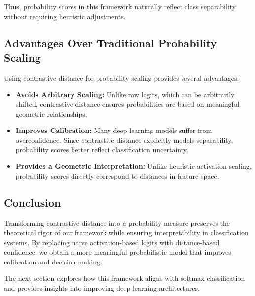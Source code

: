 Thus, probability scores in this framework naturally reflect class separability without requiring heuristic adjustments.

\subsection{Advantages Over Traditional Probability Scaling}

Using contrastive distance for probability scaling provides several advantages:

\begin{itemize}
    \item \textbf{Avoids Arbitrary Scaling:} Unlike raw logits, which can be arbitrarily shifted, contrastive distance ensures probabilities are based on meaningful geometric relationships.
    \item \textbf{Improves Calibration:} Many deep learning models suffer from overconfidence. Since contrastive distance explicitly models separability, probability scores better reflect classification uncertainty.
    \item \textbf{Provides a Geometric Interpretation:} Unlike heuristic activation scaling, probability scores directly correspond to distances in feature space.
\end{itemize}

\subsection{Conclusion}

Transforming contrastive distance into a probability measure preserves the theoretical rigor of our framework while ensuring interpretability in classification systems. By replacing naive activation-based logits with distance-based confidence, we obtain a more meaningful probabilistic model that improves calibration and decision-making.

The next section explores how this framework aligns with softmax classification and provides insights into improving deep learning architectures.
